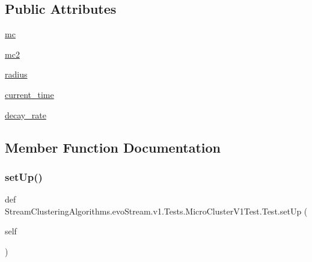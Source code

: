 \subsection*{Public Attributes}
\begin{DoxyCompactItemize}
\item 
\hyperlink{classStreamClusteringAlgorithms_1_1evoStream_1_1v1_1_1Tests_1_1MicroClusterV1Test_1_1Test_a85e023986389b8720b08b9c8103caa2a}{mc}
\item 
\hyperlink{classStreamClusteringAlgorithms_1_1evoStream_1_1v1_1_1Tests_1_1MicroClusterV1Test_1_1Test_a4cc0f32d424cd9fa7d24c89a094b5beb}{mc2}
\item 
\hyperlink{classStreamClusteringAlgorithms_1_1evoStream_1_1v1_1_1Tests_1_1MicroClusterV1Test_1_1Test_ac88ace2bf500b5b16bc4b52b5aea2caf}{radius}
\item 
\hyperlink{classStreamClusteringAlgorithms_1_1evoStream_1_1v1_1_1Tests_1_1MicroClusterV1Test_1_1Test_ada8a8303e891139420558721368d3d9f}{current\+\_\+time}
\item 
\hyperlink{classStreamClusteringAlgorithms_1_1evoStream_1_1v1_1_1Tests_1_1MicroClusterV1Test_1_1Test_a0208121554a10abdad3cb101491efda3}{decay\+\_\+rate}
\end{DoxyCompactItemize}


\subsection{Member Function Documentation}
\mbox{\label{classStreamClusteringAlgorithms_1_1evoStream_1_1v1_1_1Tests_1_1MicroClusterV1Test_1_1Test_a3061a186eb72fa52eff8851954b2639b}} 
\subsubsection{\texorpdfstring{set\+Up()}{setUp()}}
{\footnotesize\ttfamily def Stream\+Clustering\+Algorithms.\+evo\+Stream.\+v1.\+Tests.\+Micro\+Cluster\+V1\+Test.\+Test.\+set\+Up (\begin{DoxyParamCaption}\item[{}]{self }\end{DoxyParamCaption})}



